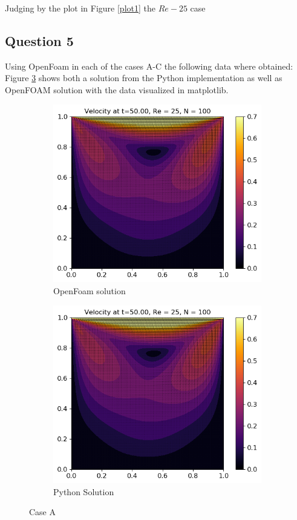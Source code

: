 \documentclass[10pt]{report}
\begin{document}
Judging by the plot in Figure \ref{plot1} the $Re-25$ case 
\subsection*{Question 5}
Using OpenFoam in each of the cases A-C the following data where obtained: Figure \ref{caseA} shows
both a solution from the Python implementation as well as OpenFOAM solution with the data visualized in matplotlib.

\begin{figure}[H]
    \centering
    \begin{subfigure}[b]{0.475\textwidth}
        \centering
        \includegraphics[width=\textwidth]{plots/velocity_RE25_OF.png}
        \caption{OpenFoam solution}
        \label{caseAof}
    \end{subfigure}
    \hfill
    \begin{subfigure}[b]{0.475\textwidth}
        \centering
        \includegraphics[width=\textwidth]{plots/velocity_RE25.png}
        \caption{Python Solution}
        \label{caseApy}
    \end{subfigure}
    \caption{Case A}
    \label{caseA}
\end{figure}
\end{document}
